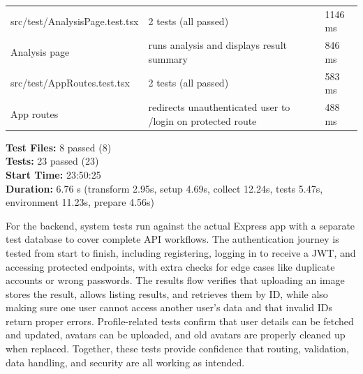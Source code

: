 \begin{table}[h!]
\begin{tabularx}{\textwidth}{lXl}
        \midrule
        src/test/AnalysisPage.test.tsx   & 2 tests (all passed)                                        & 1146 ms       \\
        Analysis page                    & runs analysis and displays result summary                   & 846 ms        \\
        \midrule
        src/test/AppRoutes.test.tsx      & 2 tests (all passed)                                        & 583 ms        \\
        App routes                       & redirects unauthenticated user to /login on protected route & 488 ms        \\
        \bottomrule
    \end{tabularx}


\end{table}

\noindent
\textbf{Test Files:} 8 passed (8) \\
\textbf{Tests:} 23 passed (23) \\
\textbf{Start Time:} 23:50:25 \\
\textbf{Duration:} 6.76 s (transform 2.95s, setup 4.69s, collect 12.24s, tests 5.47s, environment 11.23s, prepare 4.56s)

For the backend, system tests run against the actual Express app with a
separate test database to cover complete API workflows. The authentication
journey is tested from start to finish, including registering, logging in to
receive a JWT, and accessing protected endpoints, with extra checks for edge
cases like duplicate accounts or wrong passwords. The results flow verifies
that uploading an image stores the result, allows listing results, and
retrieves them by ID, while also making sure one user cannot access another
user’s data and that invalid IDs return proper errors. Profile-related tests
confirm that user details can be fetched and updated, avatars can be uploaded,
and old avatars are properly cleaned up when replaced. Together, these tests
provide confidence that routing, validation, data handling, and security are
all working as intended.

